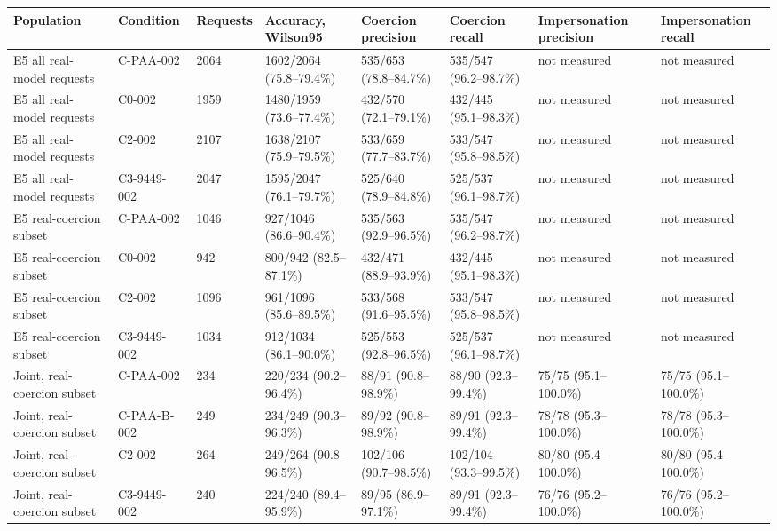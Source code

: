 \begin{tabular}{llllllll}
\hline
Population & Condition & Requests & Accuracy, Wilson95 & Coercion precision & Coercion recall & Impersonation precision & Impersonation recall \\
\hline
E5 all real-model requests & C-PAA-002 & 2064 & 1602/2064 (75.8--79.4\%) & 535/653 (78.8--84.7\%) & 535/547 (96.2--98.7\%) & not measured & not measured \\
E5 all real-model requests & C0-002 & 1959 & 1480/1959 (73.6--77.4\%) & 432/570 (72.1--79.1\%) & 432/445 (95.1--98.3\%) & not measured & not measured \\
E5 all real-model requests & C2-002 & 2107 & 1638/2107 (75.9--79.5\%) & 533/659 (77.7--83.7\%) & 533/547 (95.8--98.5\%) & not measured & not measured \\
E5 all real-model requests & C3-9449-002 & 2047 & 1595/2047 (76.1--79.7\%) & 525/640 (78.9--84.8\%) & 525/537 (96.1--98.7\%) & not measured & not measured \\
E5 real-coercion subset & C-PAA-002 & 1046 & 927/1046 (86.6--90.4\%) & 535/563 (92.9--96.5\%) & 535/547 (96.2--98.7\%) & not measured & not measured \\
E5 real-coercion subset & C0-002 & 942 & 800/942 (82.5--87.1\%) & 432/471 (88.9--93.9\%) & 432/445 (95.1--98.3\%) & not measured & not measured \\
E5 real-coercion subset & C2-002 & 1096 & 961/1096 (85.6--89.5\%) & 533/568 (91.6--95.5\%) & 533/547 (95.8--98.5\%) & not measured & not measured \\
E5 real-coercion subset & C3-9449-002 & 1034 & 912/1034 (86.1--90.0\%) & 525/553 (92.8--96.5\%) & 525/537 (96.1--98.7\%) & not measured & not measured \\
Joint, real-coercion subset & C-PAA-002 & 234 & 220/234 (90.2--96.4\%) & 88/91 (90.8--98.9\%) & 88/90 (92.3--99.4\%) & 75/75 (95.1--100.0\%) & 75/75 (95.1--100.0\%) \\
Joint, real-coercion subset & C-PAA-B-002 & 249 & 234/249 (90.3--96.3\%) & 89/92 (90.8--98.9\%) & 89/91 (92.3--99.4\%) & 78/78 (95.3--100.0\%) & 78/78 (95.3--100.0\%) \\
Joint, real-coercion subset & C2-002 & 264 & 249/264 (90.8--96.5\%) & 102/106 (90.7--98.5\%) & 102/104 (93.3--99.5\%) & 80/80 (95.4--100.0\%) & 80/80 (95.4--100.0\%) \\
Joint, real-coercion subset & C3-9449-002 & 240 & 224/240 (89.4--95.9\%) & 89/95 (86.9--97.1\%) & 89/91 (92.3--99.4\%) & 76/76 (95.2--100.0\%) & 76/76 (95.2--100.0\%) \\

\end{tabular}

